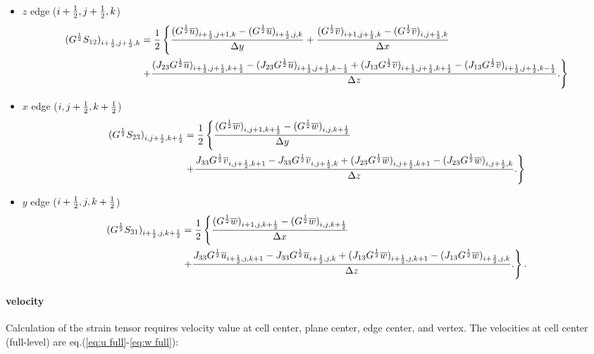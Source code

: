 \begin{itemize}
  \item $z$ edge ($i+\frac{1}{2},j+\frac{1}{2},k$)
    \begin{align}
      (G^{\frac{1}{2}}S_{12})_{i+\frac{1}{2},j+\frac{1}{2},k} &= \frac{1}{2}\left\{
      \frac{(G^{\frac{1}{2}}\overline{u})_{i+\frac{1}{2},j+1,k}-(G^{\frac{1}{2}}\overline{u})_{i+\frac{1}{2},j,k}}{\Delta y}
     +\frac{(G^{\frac{1}{2}}\overline{v})_{i+1,j+\frac{1}{2},k}-(G^{\frac{1}{2}}\overline{v})_{i,j+\frac{1}{2},k}}{\Delta x}  \right.\nonumber \\ &\left.
     +\frac{(J_{23}G^{\frac{1}{2}}\overline{u})_{i+\frac{1}{2},j+\frac{1}{2},k+\frac{1}{2}}-(J_{23}G^{\frac{1}{2}}\overline{u})_{i+\frac{1}{2},j+\frac{1}{2},k-\frac{1}{2}} + (J_{13}G^{\frac{1}{2}}\overline{v})_{i+\frac{1}{2},j+\frac{1}{2},k+\frac{1}{2}}-(J_{13}G^{\frac{1}{2}}\overline{v})_{i+\frac{1}{2},j+\frac{1}{2},k-\frac{1}{2}}}{\Delta z}.
      \right\}
    \end{align}

  \item $x$ edge ($i,j+\frac{1}{2},k+\frac{1}{2}$)
    \begin{align}
      (G^{\frac{1}{2}}S_{23})_{i,j+\frac{1}{2},k+\frac{1}{2}} &= \frac{1}{2}\left\{
      \frac{(G^{\frac{1}{2}}\overline{w})_{i,j+1,k+\frac{1}{2}}-(G^{\frac{1}{2}}\overline{w})_{i,j,k+\frac{1}{2}}}{\Delta y} \right. \nonumber \\ & \left.
      + \frac{J_{33}G^{\frac{1}{2}}\overline{v}_{i,j+\frac{1}{2},k+1}-J_{33}G^{\frac{1}{2}}\overline{v}_{i,j+\frac{1}{2},k} + (J_{23}G^{\frac{1}{2}}\overline{w})_{i,j+\frac{1}{2},k+1}-(J_{23}G^{\frac{1}{2}}\overline{w})_{i,j+\frac{1}{2},k}}{\Delta z}.
      \right\}
    \end{align}

  \item $y$ edge ($i+\frac{1}{2},j,k+\frac{1}{2}$)
    \begin{align}
      (G^{\frac{1}{2}}S_{31})_{i+\frac{1}{2},j,k+\frac{1}{2}} &= \frac{1}{2}\left\{
      \frac{(G^{\frac{1}{2}}\overline{w})_{i+1,j,k+\frac{1}{2}}-(G^{\frac{1}{2}}\overline{w})_{i,j,k+\frac{1}{2}}}{\Delta x} \right. \nonumber \\ & \left.
     +\frac{J_{33}G^{\frac{1}{2}}\overline{u}_{i+\frac{1}{2},j,k+1}-J_{33}G^{\frac{1}{2}}\overline{u}_{i+\frac{1}{2},j,k} + (J_{13}G^{\frac{1}{2}}\overline{w})_{i+\frac{1}{2},j,k+1}-(J_{13}G^{\frac{1}{2}}\overline{w})_{i+\frac{1}{2},j,k}}{\Delta z}.
      \right\}.
    \end{align}

\end{itemize}


\paragraph{velocity}
Calculation of the strain tensor requires velocity value at cell center, plane center, edge center, and vertex. The velocities at cell center (full-level) are eq.(\ref{eq:u full}-\ref{eq:w full}):

